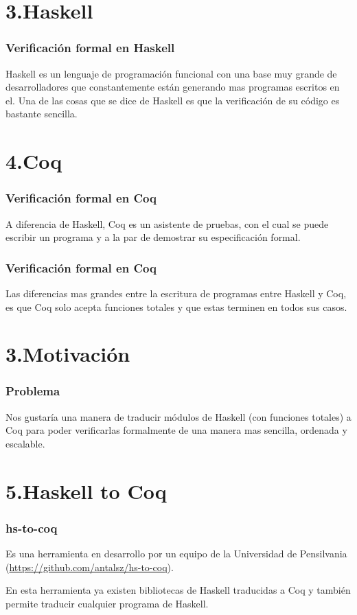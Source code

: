 \documentclass[xcolor=dvipsnames,table,handout]{beamer}
\begin{document}
\section{3.Haskell}
\begin{frame}
  \frametitle{Verificación formal en Haskell}
    Haskell es un lenguaje de programaci\'on funcional con una base muy grande
de desarrolladores que constantemente están generando mas programas escritos en
el.
\vspace*{10pt}
    \newline Una de las cosas que se dice de Haskell es que la verificación de
su código es bastante sencilla.

\newline{}
\end{frame}

\section{4.Coq}
\begin{frame}
  \frametitle{Verificación formal en Coq}
	A diferencia de Haskell, Coq es un asistente de pruebas, con el cual se
puede escribir un programa y a la par de demostrar su especificación formal.
\end{frame}

\begin{frame}
  \frametitle{Verificación formal en Coq}
    Las diferencias mas grandes entre la escritura de programas entre Haskell y
Coq, es que Coq solo acepta funciones totales y que estas terminen en todos sus
casos.
\end{frame}
\section{3.Motivación}
\begin{frame}
  \frametitle{Problema}
       Nos gustaría una manera de traducir módulos de Haskell (con funciones
totales) a Coq para poder verificarlas formalmente de una manera mas sencilla,
ordenada y escalable.
\end{frame}
\section{5.Haskell to Coq}
\begin{frame}
  \frametitle{hs-to-coq}
       Es una herramienta en desarrollo por un equipo de la Universidad de
Pensilvania (\url{https://github.com/antalsz/hs-to-coq}).

       En esta herramienta ya existen bibliotecas de Haskell traducidas a Coq y
también permite traducir cualquier programa de Haskell.
\end{frame}
\end{document}
